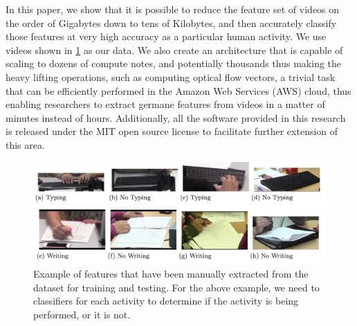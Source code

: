 In this paper, we show that it is possible to reduce the feature set of videos
on the order of Gigabytes down to tens of Kilobytes, and then accurately
classify those features at very high accuracy as a particular human activity. We
use videos shown in \ref{fig:typing_writing} as our data. We also create an
architecture that is capable of scaling to dozens of compute notes, and
potentially thousands thus making the heavy lifting operations, such as
computing optical flow vectors, a trivial task that can be efficiently performed
in the Amazon Web Services (AWS) cloud, thus enabling researchers to extract
germane features from videos in a matter of minutes instead of hours.
Additionally, all the software provided in this research is released under the
MIT open source license to facilitate further extension of this area.

\begin{figure}[t]
  \centering
  \includegraphics[width=\textwidth]{figures/typing_writing_clip}
  \caption{Example of features that have been manually extracted from the dataset
  for training and testing. For the above example, we need to classifiers for each
  activity to determine if the activity is being performed, or it is not.}
  \label{fig:typing_writing}
\end{figure}
